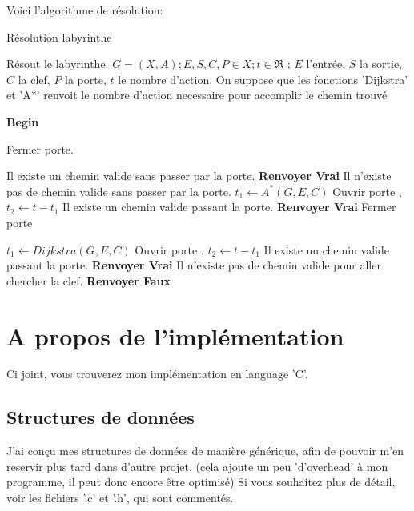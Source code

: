 \documentclass[10pt]{article}
\begin{document}
		Voici l'algorithme de résolution:
		\begin{algorithm}
			\caption{Résolution labyrinthe}
			\begin{algorithmic}
				\ENSURE Résout le labyrinthe.
				\REQUIRE $G = (X, A) ; E, S, C, P \in X ; t \in \Re$ ;
						$E$ l'entrée, $S$ la sortie, $C$ la clef, $P$ la porte,
						$t$ le nombre d'action. On suppose que les fonctions 'Dijkstra' et 'A*' renvoit le nombre
						d'action necessaire pour accomplir le chemin trouvé
				
				\STATE \textbf{Begin}
				
				\STATE Fermer porte.
				
					\PRINT Il existe un chemin valide sans passer par la porte. \textbf{Renvoyer Vrai}
				\ENDIF
				\PRINT Il n'existe pas de chemin valide sans passer par la porte.
				\STATE $t_1 \leftarrow A^*(G, E, C)$
					\STATE Ouvrir porte , $t_2 \leftarrow t - t_1$
						\PRINT Il existe un chemin valide passant la porte. \textbf{Renvoyer Vrai}
					\ENDIF
					\STATE Fermer porte
				\ENDIF
				
				\STATE $t_1 \leftarrow Dijkstra(G, E, C)$
					\STATE Ouvrir porte , $t_2 \leftarrow t - t_1$
						\PRINT Il existe un chemin valide passant la porte. \textbf{Renvoyer Vrai}
					\ENDIF
				\ENDIF
				\PRINT Il n'existe pas de chemin valide pour aller chercher la clef. \textbf{Renvoyer Faux}

			\end{algorithmic}
		\end{algorithm}

	\section{A propos de l'implémentation}
		Ci joint, vous trouverez mon implémentation en language 'C'.
		\subsection{Structures de données}
		J'ai conçu mes structures de données de manière générique, afin de pouvoir m'en reservir plus tard dans d'autre projet.
		(cela ajoute un peu 'd'overhead' à mon programme, il peut donc encore être optimisé)
		Si vous souhaitez plus de détail, voir les fichiers '.c' et '.h', qui sont commentés.
\end{document}

